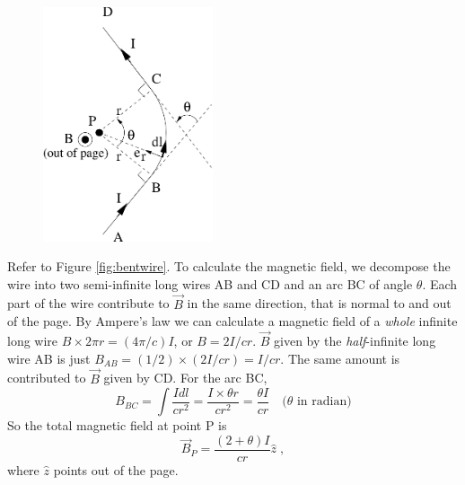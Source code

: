 \documentclass[makesolutionspdf]{esg8022pset}
\begin{document}
\begin{solution}


   \begin{figure}[ht]
    \centering
    \includegraphics[width = 5cm]{BS1v05}
    \label{fig:bentwire}
  \end{figure}

Refer to Figure \autoref{fig:bentwire}.  To calculate the magnetic
field, we decompose the wire into two semi-infinite long wires AB and
CD and an arc BC of angle $\theta$.  Each part of the wire contribute to $\vec{B}$ in
the same direction, that is normal to and out of the page.  By Ampere's law we
can calculate a magnetic field of a {\sl whole} infinite long wire
$B\times 2\pi r=(4\pi/c)I$, or $B=2I/cr$.   $\vec{B}$ given by the
{\sl half}-infinite long wire AB is just $B_{AB}=(1/2)\times
(2I/cr)=I/cr$.  The same amount is contributed to $\vec{B}$ given by
CD.  For the arc BC,
\begin{equation}
B_{BC}=\int\frac{Idl}{cr^2}=\frac{I\times \theta r}{cr^2}=\frac{\theta I}{cr}\quad\textrm{($\theta$ in radian)}
\end{equation}
So the total magnetic field at point P is 
\begin{equation}
\vec B_P=\frac{(2+\theta)I}{cr}\hat z\;,
\end{equation}
where $\hat z$ points out of the page.

\end{solution}
\end{document}
